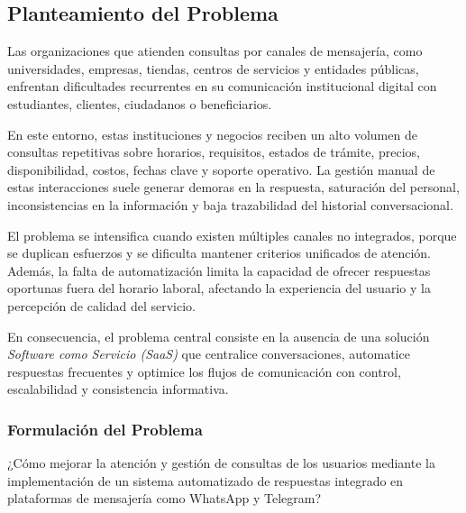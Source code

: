\subsection{Planteamiento del Problema}

Las organizaciones que atienden consultas por canales de mensajería, como universidades, empresas, tiendas, centros de servicios y entidades públicas, enfrentan dificultades recurrentes en su comunicación institucional digital con estudiantes, clientes, ciudadanos o beneficiarios.

En este entorno, estas instituciones y negocios reciben un alto volumen de consultas repetitivas sobre horarios, requisitos, estados de trámite, precios, disponibilidad, costos, fechas clave y soporte operativo. La gestión manual de estas interacciones suele generar demoras en la respuesta, saturación del personal, inconsistencias en la información y baja trazabilidad del historial conversacional.

El problema se intensifica cuando existen múltiples canales no integrados, porque se duplican esfuerzos y se dificulta mantener criterios unificados de atención. Además, la falta de automatización limita la capacidad de ofrecer respuestas oportunas fuera del horario laboral, afectando la experiencia del usuario y la percepción de calidad del servicio.

En consecuencia, el problema central consiste en la ausencia de una solución \textit{Software como Servicio (SaaS)} que centralice conversaciones, automatice respuestas frecuentes y optimice los flujos de comunicación con control, escalabilidad y consistencia informativa.
\subsubsection{Formulación del Problema}
¿Cómo mejorar la atención y gestión de consultas de los usuarios mediante la implementación de un sistema automatizado de respuestas integrado en plataformas de mensajería como WhatsApp y Telegram?